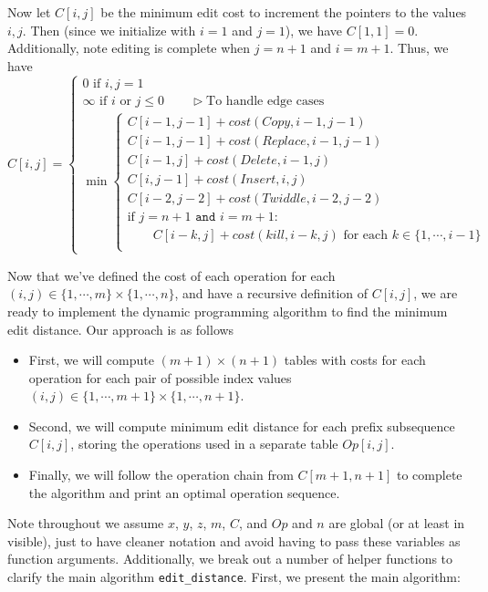 \documentclass[paper=a4, fontsize=11pt]{scrartcl} %
\numberwithin{equation}{section} %
\numberwithin{figure}{section} %
\numberwithin{table}{section} %
\begin{document}
Now let $C[i, j]$ be the minimum edit cost to increment the pointers to the values $i, j$. Then (since we initialize with $i = 1$ and $j = 1$), we have $C[1, 1]  = 0$. Additionally, note editing is complete when $j = n + 1$ and $i = m + 1$. Thus, we have
\[
C[i,j] = \begin{cases}
0 \textrm{ if } i, j = 1 \\
\infty \textrm{ if } i \textrm{ or } j \leq 0 \qquad{} \triangleright \textrm{To handle edge cases}\\
\min
\begin{cases}
C[i - 1, j - 1] + cost(Copy, i - 1, j - 1) \\
C[i - 1, j - 1] + cost(Replace, i - 1, j - 1) \\
C[i - 1, j] + cost(Delete, i - 1, j) \\
C[i, j-1] + cost(Insert, i, j) \\
C[i-2, j-2] + cost(Twiddle, i-2, j-2) \\
\textrm{if } j = n + 1 \texttt{ and } i = m + 1: \\
\qquad{} C[i - k, j] + cost(kill, i - k, j) \textrm{ for each } k \in \{1, \cdots, i-1\} \\
\end{cases}\end{cases}
\]

Now that we've defined the cost of each operation for each $(i, j) \in \{1, \cdots, m\} \times \{1, \cdots, n\}$, and have a recursive definition of $C[i,j]$, we are ready to implement the dynamic programming algorithm to find the minimum edit distance. Our approach is as follows
\begin{itemize}
\item First, we will compute $(m + 1) \times (n + 1)$ tables with costs for each operation for each pair of possible index values $(i, j) \in \{1, \cdots, m + 1\} \times \{1, \cdots, n + 1\}$.
\item Second, we will compute minimum edit distance for each prefix subsequence $C[i, j]$, storing the operations used in a separate table $Op[i,j]$.
\item  Finally, we will follow the operation chain from $C[m + 1, n + 1]$ to complete the algorithm and print an optimal operation sequence.
\end{itemize}
Note throughout we assume $x$, $y$, $z$, $m$, $C$, and $Op$ and $n$ are global (or at least in visible), just to have cleaner notation and avoid having to pass these variables as function arguments. Additionally, we break out a number of helper functions to clarify the main algorithm \texttt{edit\_distance}. First, we present the main algorithm:\\
\end{document}
